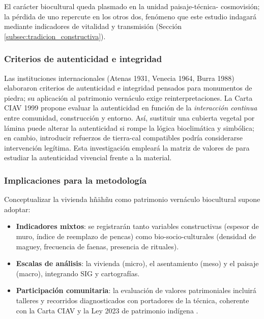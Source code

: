 El carácter biocultural queda plasmado en la unidad paisaje-técnica-
cosmovisión; la pérdida de uno repercute en los otros dos, fenómeno que
este estudio indagará mediante indicadores de vitalidad y
transmisión (Sección \ref{subsec:tradicion_constructiva}).

\subsubsection{Criterios de autenticidad e integridad}

Las instituciones internacionales (Atenas 1931, Venecia 1964,
Burra 1988) elaboraron criterios de autenticidad e integridad pensados
para monumentos de piedra; su aplicación al patrimonio vernáculo exige
reinterpretaciones.  La Carta CIAV 1999 propone evaluar la autenticidad
en función de la \emph{interacción continua} entre comunidad,
construcción y entorno.  Así, sustituir una cubierta vegetal por lámina
puede alterar la autenticidad si rompe la lógica bioclimática y
simbólica; en cambio, introducir refuerzos de tierra-cal compatibles
podría considerarse intervención legítima.  Esta investigación
empleará la matriz de valores de \cite{delatorre2002values} para
estudiar la autenticidad vivencial frente a la material.

\subsubsection{Implicaciones para la metodología}

Conceptualizar la vivienda hñähñu como patrimonio vernáculo biocultural
supone adoptar:

\begin{itemize}
	\item \textbf{Indicadores mixtos}: se registrarán tanto variables
	      constructivas (espesor de muro, índice de reemplazo de pencas)
	      como bio-socio-culturales (densidad de maguey, frecuencia de
	      faenas, presencia de rituales).
	\item \textbf{Escalas de análisis}: la vivienda (micro),
	      el asentamiento (meso) y el paisaje (macro), integrando SIG y
	      cartografías.
	\item \textbf{Participación comunitaria}: la evaluación de valores
	      patrimoniales incluirá talleres y recorridos diagnosticados con
	      portadores de la técnica, coherente con la Carta CIAV y la Ley
	      2023 de patrimonio indígena \citep{ley2023patrimonio}.
\end{itemize}

